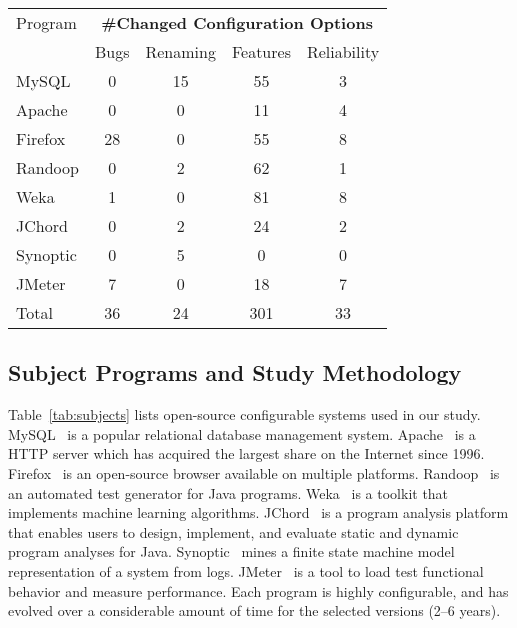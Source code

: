\begin{table}[t]
\vspace{1mm}
\centering
\small{
\setlength{\tabcolsep}{.50\tabcolsep}
\begin{tabular}{|l|c|c|c|c|}
\hline
 Program & \multicolumn{4}{|c|}{\textbf{\#Changed Configuration Options}} \\
 \cline{2-5}
 & Bugs & Renaming & Features & Reliability \\
 \hline
 \hline
 MySQL & 0 & 15 & 55 & 3 \\
 Apache& 0 & 0 & 11 & 4 \\
 Firefox& 28 & 0 & 55 & 8 \\
 Randoop & 0  & 2 & 62  & 1\\
 Weka & 1  & 0 & 81  & 8 \\
 JChord & 0  & 2 & 24 & 2\\ %
 Synoptic & 0 &  5 & 0 & 0\\
 JMeter & 7  & 0 & 18 & 7 \\
\hline
\hline
 Total & 36 & 24 & 301 & 33 \\
\hline
\end{tabular}
}
\vspace{-2mm}
\end{table}


\subsection{Subject Programs and Study Methodology}


Table~\ref{tab:subjects} lists
\studysubjnum open-source configurable systems used in our
study.
MySQL~\cite{mysql}  is a popular relational database management
system. Apache~\cite{apache} is a HTTP server which has acquired
the largest share on the Internet since 1996. Firefox~\cite{firefox}
is an open-source browser available on multiple platforms.
Randoop~\cite{randoop} is an automated test generator for Java
programs. Weka~\cite{weka} is a toolkit that implements machine
learning algorithms. JChord~\cite{jchord} is a program analysis platform that
enables users to design, implement, and evaluate static and
dynamic program analyses for Java. Synoptic~\cite{synoptic} mines a
finite state machine model representation of a system from
logs. JMeter~\cite{jmeter} is a tool to load test functional
behavior and measure performance.
Each program is highly configurable, and has evolved over
a considerable amount of time for the selected versions ({2--6} years).


